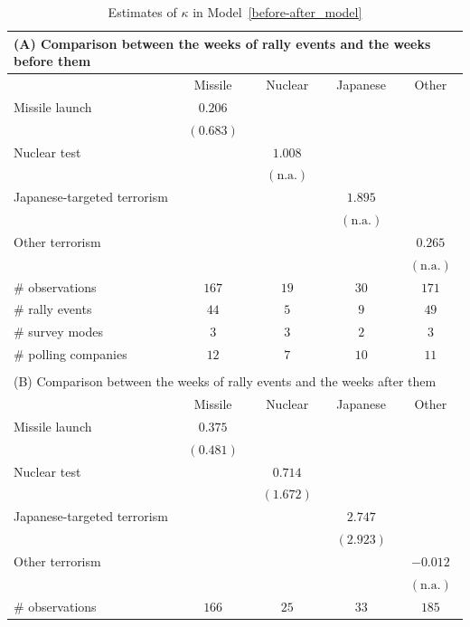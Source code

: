 \documentclass[12pt,letterpaper]{scrartcl}
\begin{document}
\begin{table}[t]
\begin{minipage}{\hsize}
\centering
\small
\singlespacing
\caption{Estimates of $\kappa $ in Model~\eqref{before-after_model}}
\label{table_before-after}
\bigskip
\begin{tabular}{lcccc}
\multicolumn{5}{l}{(A) Comparison between the weeks of rally events and the weeks before them} \\\toprule
 & Missile & Nuclear & Japanese & Other \\\midrule
Missile launch & $0.206$ &  &  &  \\
 & $(0.683)$ & & & \\
Nuclear test &  & $1.008$ &  &  \\
 & & $(\text{n.a.})$ & & \\
Japanese-targeted terrorism &  &  & $1.895$ &  \\
 & & & $(\text{n.a.})$ & \\
Other terrorism &  &  &  & $0.265$ \\
 & & & & $(\text{n.a.})$ \\
\# observations & $167$ & $19$ & $30$ & $171$ \\
\# rally events & $44$ & $5$ & $9$ & $49$ \\
\# survey modes & $3$ & $3$ & $2$ & $3$ \\
\# polling companies & $12$ & $7$ & $10$ & $11$ \\\bottomrule
 & \hspace{40pt} & \hspace{40pt} & \hspace{40pt} & \hspace{40pt} \\
\multicolumn{5}{l}{(B) Comparison between the weeks of rally events and the weeks after them} \\\toprule
 & Missile & Nuclear & Japanese & Other \\\midrule
Missile launch & $0.375$ &  &  &  \\
 & $(0.481)$ & & & \\
Nuclear test &  & $0.714$ &  &  \\
 & & $(1.672)$ & & \\
Japanese-targeted terrorism &  &  & $2.747$ &  \\
 & & & $(2.923)$ & \\
Other terrorism &  &  &  & $-0.012$ \\
 & & & & $(\text{n.a.})$ \\
\# observations & $166$ & $25$ & $33$ & $185$ \\

\end{tabular}
\end{minipage}
\end{table}
\end{document}
